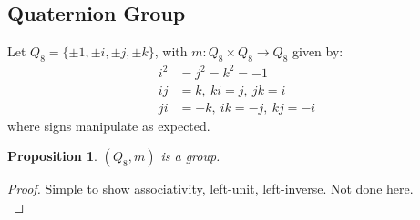 \documentclass{article}
\newtheorem{theorem}{Proposition}[section]
\theoremstyle{definition}
\theoremstyle{remark}
\begin{document}
\subsection{Quaternion Group}
Let $Q_8=\lbrace \pm 1,\pm i,\pm j,\pm k \rbrace$, with $m:Q_8\times Q_8\rightarrow Q_8$ given by:
\begin{align*}
	i^2 & =j^2=k^2=-1       \\
	ij  & =k,~ki=j,~jk=i    \\
	ji  & =-k,~ik=-j,~kj=-i
\end{align*}
where signs manipulate as expected.\\

\begin{theorem}
	$(Q_8,m)$ is a group.
\end{theorem}
\begin{proof}
	Simple to show associativity, left-unit, left-inverse. Not done here.\\
\end{proof}

\newpage
\end{document}
